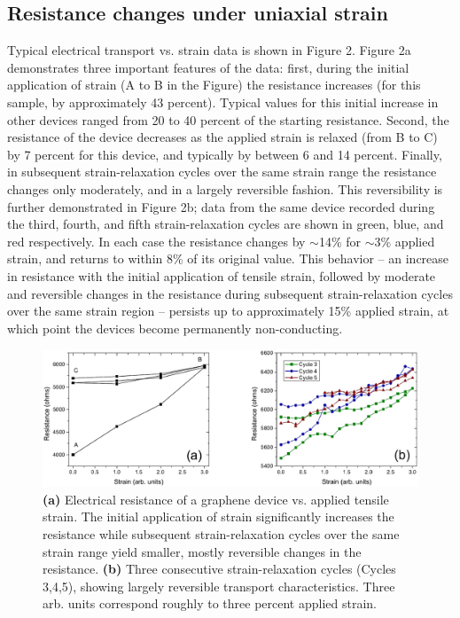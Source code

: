 \documentclass[edeposit,fullpage,draftthesis]{uiucthesis2009}
\begin{document}
    \subsection{Resistance changes under uniaxial strain}
    
    Typical electrical transport vs. strain data is shown in Figure 2. Figure 2a demonstrates three important features of the data: first, during the initial application of strain (A to B in the Figure) the resistance increases (for this sample, by approximately 43 percent). Typical values for this initial increase in other devices ranged from 20 to 40 percent of the starting resistance. Second, the resistance of the device decreases as the applied strain is relaxed (from B to C) by 7 percent for this device, and typically by between 6 and 14 percent. Finally, in subsequent strain-relaxation cycles over the same strain range the resistance changes only moderately, and in a largely reversible fashion. This reversibility is further demonstrated in Figure 2b; data from the same device recorded during the third, fourth, and fifth strain-relaxation cycles are shown in green, blue, and red respectively. In each case the resistance changes by $\sim$14\% for $\sim$3\% applied strain, and returns to within 8\% of its original value. This behavior -- an increase in resistance with the initial application of tensile strain, followed by moderate and reversible changes in the resistance during subsequent strain-relaxation cycles over the same strain region -- persists up to approximately 15\% applied strain, at which point the devices become permanently non-conducting.

    \begin{figure}
    \includegraphics[width=\linewidth]{images/resultsanddiscussion/rippingpaper-RvsStrain.eps}
    \caption[Resistance vs Strain for graphene on flexible substrates]{\textbf{(a)} Electrical resistance of a graphene device vs. applied tensile strain. The initial application of strain significantly increases the resistance while subsequent strain-relaxation cycles over the same strain range yield smaller, mostly reversible changes in the resistance. \textbf{(b)} Three consecutive strain-relaxation cycles (Cycles 3,4,5), showing largely reversible transport characteristics. Three arb. units correspond roughly to three percent applied strain.}
    \label{fig:rippingpaper-RvsStrain}
    \end{figure}
\end{document}
